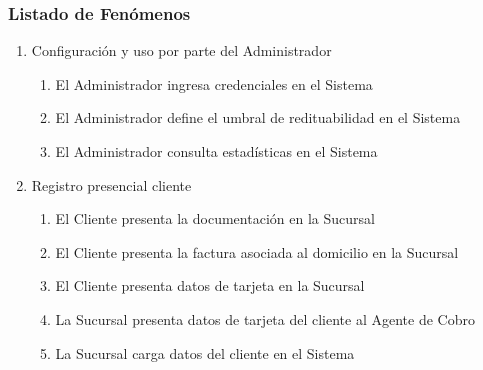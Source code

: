 \subsubsection{Listado de Fenómenos}
\begin{enumerate}
  \item Configuración y uso por parte del Administrador
  \begin{enumerate}
    \item El Administrador ingresa credenciales en el Sistema \label{itm:f-administrador-credencial-sistema}
    \item El Administrador define el umbral de redituabilidad en el Sistema \label{itm:f-administrador-umbral-sistema}
    \item El Administrador consulta estadísticas en el Sistema \label{itm:f-administrador-estadistica-sistema}
  \end{enumerate}

  \item Registro presencial cliente
  \begin{enumerate}
    \item El Cliente presenta la documentación en la Sucursal \label{itm:f-cliente-documentacion-sucursal}
    \item El Cliente presenta la factura asociada al domicilio en la Sucursal \label{itm:f-cliente-domicilio-sucursal}
    \item El Cliente presenta datos de tarjeta en la Sucursal \label{itm:f-cliente-tarjeta-sucursal}
    \item La Sucursal presenta datos de tarjeta del cliente al Agente de Cobro \label{itm:f-sucursal-tarjeta-agentecobro}
    \item La Sucursal carga datos del cliente en el Sistema \label{itm:f-sucursal-carga-cliente-sistema}
  \end{enumerate}


\end{enumerate}
